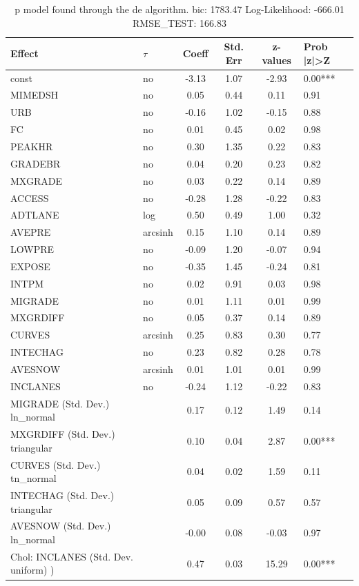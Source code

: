 \begin{table}
	\caption{p model found through the de algorithm. bic: 1783.47 Log-Likelihood: -666.01 RMSE_TEST: 166.83}
	\begin{center}
		\begin{tabular}{|l|l|c|c|c|l|}
			\hline
			Effect & $\tau$ & Coeff & Std. Err & z-values & Prob |z|>Z \\
			\hline
			const & no & -3.13 & 1.07 & -2.93 & 0.00*** \\
			\hline
			MIMEDSH & no & 0.05 & 0.44 & 0.11 & 0.91 \\
			\hline
			URB & no & -0.16 & 1.02 & -0.15 & 0.88 \\
			\hline
			FC & no & 0.01 & 0.45 & 0.02 & 0.98 \\
			\hline
			PEAKHR & no & 0.30 & 1.35 & 0.22 & 0.83 \\
			\hline
			GRADEBR & no & 0.04 & 0.20 & 0.23 & 0.82 \\
			\hline
			MXGRADE & no & 0.03 & 0.22 & 0.14 & 0.89 \\
			\hline
			ACCESS & no & -0.28 & 1.28 & -0.22 & 0.83 \\
			\hline
			ADTLANE & log & 0.50 & 0.49 & 1.00 & 0.32 \\
			\hline
			AVEPRE & arcsinh & 0.15 & 1.10 & 0.14 & 0.89 \\
			\hline
			LOWPRE & no & -0.09 & 1.20 & -0.07 & 0.94 \\
			\hline
			EXPOSE & no & -0.35 & 1.45 & -0.24 & 0.81 \\
			\hline
			INTPM & no & 0.02 & 0.91 & 0.03 & 0.98 \\
			\hline
			MIGRADE & no & 0.01 & 1.11 & 0.01 & 0.99 \\
			\hline
			MXGRDIFF & no & 0.05 & 0.37 & 0.14 & 0.89 \\
			\hline
			CURVES & arcsinh & 0.25 & 0.83 & 0.30 & 0.77 \\
			\hline
			INTECHAG & no & 0.23 & 0.82 & 0.28 & 0.78 \\
			\hline
			AVESNOW & arcsinh & 0.01 & 1.01 & 0.01 & 0.99 \\
			\hline
			INCLANES & no & -0.24 & 1.12 & -0.22 & 0.83 \\
			\hline
			MIGRADE (Std. Dev.) ln_normal &  & 0.17 & 0.12 & 1.49 & 0.14 \\
			\hline
			MXGRDIFF (Std. Dev.) triangular &  & 0.10 & 0.04 & 2.87 & 0.00*** \\
			\hline
			CURVES (Std. Dev.) tn_normal &  & 0.04 & 0.02 & 1.59 & 0.11 \\
			\hline
			INTECHAG (Std. Dev.) triangular &  & 0.05 & 0.09 & 0.57 & 0.57 \\
			\hline
			AVESNOW (Std. Dev.) ln_normal &  & -0.00 & 0.08 & -0.03 & 0.97 \\
			\hline
			 Chol: INCLANES (Std. Dev. uniform) ) &  & 0.47 & 0.03 & 15.29 & 0.00*** \\
			\hline
		\end{tabular}
	\end{center}
\end{table}